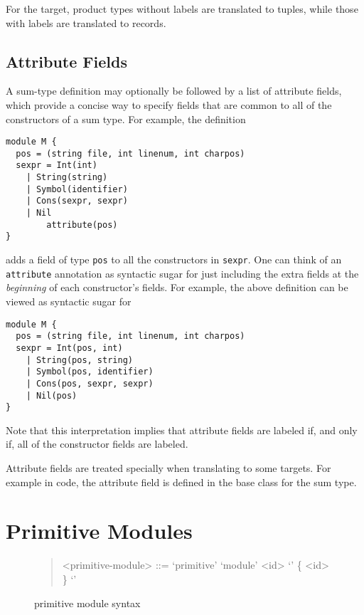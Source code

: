 For the \sml{} target, product types without labels are translated to tuples, while those with
labels are translated to records.

\subsection{Attribute Fields}
A sum-type definition may optionally be followed by a list of attribute fields, which
provide a concise way to specify fields that are common to all of the constructors
of a sum type.
For example, the definition
%
\begin{code}\begin{lstlisting}[language=ASDL]
module M {
  pos = (string file, int linenum, int charpos)
  sexpr = Int(int)
	| String(string)
	| Symbol(identifier)
	| Cons(sexpr, sexpr)
	| Nil
        attribute(pos)
}
\end{lstlisting}\end{code}%
adds a field of type \lstinline[language=ASDL]!pos! to all the constructors
in \lstinline[language=ASDL]!sexpr!.
One can think of an \lstinline!attribute! annotation as syntactic sugar for just including
the extra fields at the \emph{beginning} of each constructor's fields.
For example, the above definition can be viewed as syntactic sugar for
%
\begin{code}\begin{lstlisting}[language=ASDL]
module M {
  pos = (string file, int linenum, int charpos)
  sexpr = Int(pos, int)
	| String(pos, string)
	| Symbol(pos, identifier)
	| Cons(pos, sexpr, sexpr)
	| Nil(pos)
}
\end{lstlisting}\end{code}%
Note that this interpretation implies that attribute fields are labeled if, and only if, all
of the constructor fields are labeled.

Attribute fields are treated specially when translating to some targets.
For example in \Cplusplus{} code, the attribute field is defined in the base class for the sum type.

\section{Primitive Modules}
\label{sec:primitive-syntax}

\begin{figure}[t]
  \begin{quote}
    \begin{grammar}
      <primitive-module> ::= `primitive' `module' <id> `{' \{ <id> \} `}'
    \end{grammar}%
  \end{quote}%
  \caption{\asdl{} primitive module syntax}
  \label{fig:prim-module-syntax}
\end{figure}%

